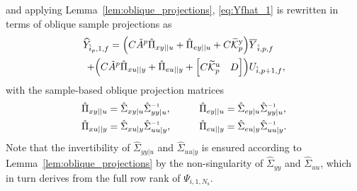 and applying Lemma~\ref{lem:oblique_projections}, \eqref{eq:Yfhat_1} is rewritten in terms of oblique sample projections as
\begin{align}\label{eq:Yfhat_2}
    \begin{split}
    \widehat{Y}_{\hat{i}_p,1,f} = \Big(C\tilde{A}^p\hat{\Pi}_{xy||u}+\hat{\Pi}_{ey||u}
    + C\widetilde{\mathcal{K}}_{p}^{\mathrm{{y}}}\Big)&\overline{Y}_{\hat{i},p,f}\\
    +\Big(C\tilde{A}^p\hat{\Pi}_{xu||y}+\hat{\Pi}_{eu||y}+
    \begin{bmatrix}C\widetilde{\mathcal{K}}_{p}^{\mathrm{{u}}} & D \end{bmatrix}\!\Big)&U_{\hat{i},p+1,f},
    \end{split}
\end{align}
with the sample-based oblique projection matrices
\begin{alignat*}{3}
    \hat{\Pi}_{xy||u}&=\hat{\Sigma}_{xy|u}\hat{\Sigma}_{yy|u}\inv, \qquad &\hat{\Pi}_{ey||u}&=\hat{\Sigma}_{ey|u}\hat{\Sigma}_{yy|u}\inv,\\
    \hat{\Pi}_{xu||y}&=\hat{\Sigma}_{xu|y}\hat{\Sigma}_{uu|y}\inv,        &\hat{\Pi}_{eu||y}&=\hat{\Sigma}_{eu|y}\hat{\Sigma}_{uu|y}\inv.
\end{alignat*}
Note that the invertibility of $\hat{\Sigma}_{yy|u}$ and $\hat{\Sigma}_{uu|y}$ is ensured according to Lemma~\ref{lem:oblique_projections} by the non-singularity of $\hat{\Sigma}_{yy}$ and $\hat{\Sigma}_{uu}$, which in turn derives from the full row rank of $\Psi_{i,1,N_\mathrm{s}}$.

